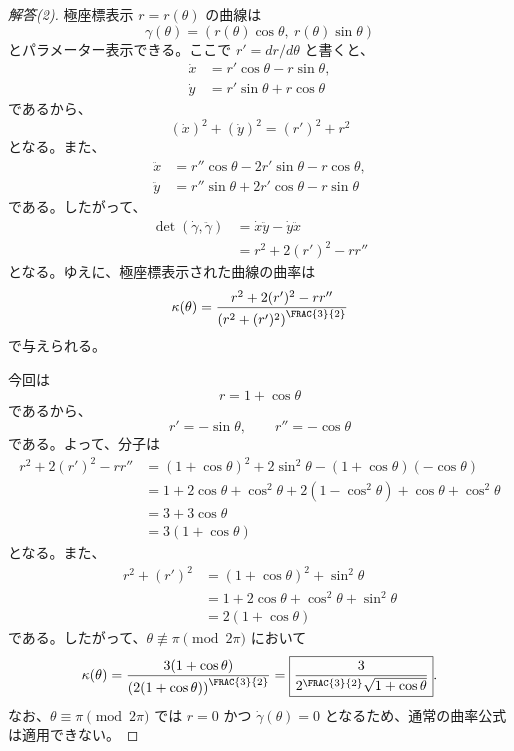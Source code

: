 \documentclass[article,paper=a4paper]{jlreq}
\begin{document}
\begin{proof}[解答(2)]
    極座標表示 $r=r(\theta)$ の曲線は
    \[
        \gamma(\theta)
        =
        \left(r(\theta)\cos\theta,\ r(\theta)\sin\theta\right)
    \]
    とパラメーター表示できる。ここで $r'=dr/d\theta$ と書くと、
    \begin{align*}
        \dot{x} &= r'\cos\theta-r\sin\theta,\\
        \dot{y} &= r'\sin\theta+r\cos\theta
    \end{align*}
    であるから、
    \[
        (\dot{x})^2+(\dot{y})^2
        =
        (r')^2+r^2
    \]
    となる。また、
    \begin{align*}
        \ddot{x}
        &=
        r''\cos\theta-2r'\sin\theta-r\cos\theta,\\
        \ddot{y}
        &=
        r''\sin\theta+2r'\cos\theta-r\sin\theta
    \end{align*}
    である。したがって、
    \begin{align*}
        \det(\dot{\gamma},\ddot{\gamma})
        &=
        \dot{x}\ddot{y}-\dot{y}\ddot{x}\\
        &=
        r^2+2(r')^2-rr''
    \end{align*}
    となる。ゆえに、極座標表示された曲線の曲率は
    \[
        \kappa(\theta)
        =
        \frac{r^2+2(r')^2-rr''}
        {\left(r^2+(r')^2\right)^{\FRAC{3}{2}}}
    \]
    で与えられる。

    今回は
    \[
        r=1+\cos\theta
    \]
    であるから、
    \[
        r'=-\sin\theta,\qquad r''=-\cos\theta
    \]
    である。よって、分子は
    \begin{align*}
        r^2+2(r')^2-rr''
        &=
        (1+\cos\theta)^2
        +2\sin^2\theta
        -(1+\cos\theta)(-\cos\theta)\\
        &=
        1+2\cos\theta+\cos^2\theta
        +2(1-\cos^2\theta)
        +\cos\theta+\cos^2\theta\\
        &=
        3+3\cos\theta\\
        &=
        3(1+\cos\theta)
    \end{align*}
    となる。また、
    \begin{align*}
        r^2+(r')^2
        &=
        (1+\cos\theta)^2+\sin^2\theta\\
        &=
        1+2\cos\theta+\cos^2\theta+\sin^2\theta\\
        &=
        2(1+\cos\theta)
    \end{align*}
    である。したがって、$\theta \not\equiv \pi \pmod{2\pi}$ において
    \[
        \kappa(\theta)
        =
        \frac{3(1+\cos\theta)}
        {\left(2(1+\cos\theta)\right)^{\FRAC{3}{2}}}
        =
        \boxed{
        \frac{3}{2^{\FRAC{3}{2}}\sqrt{1+\cos\theta}}
        }.
    \]
    なお、$\theta \equiv \pi \pmod{2\pi}$ では $r=0$ かつ $\dot{\gamma}(\theta)=0$ となるため、通常の曲率公式は適用できない。
\end{proof}
\end{document}
